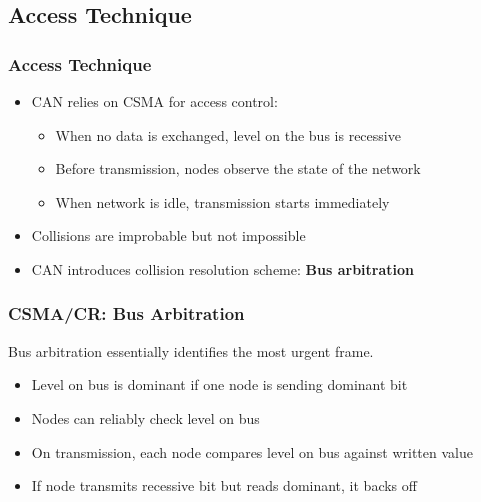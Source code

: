 \documentclass{beamer}
\begin{document}
\subsection{Access Technique}
\begin{frame}
	\frametitle{Access Technique}
	\begin{itemize}
		\item CAN relies on CSMA for access control:
		\begin{itemize}
			\item When no data is exchanged, level on the bus is recessive
			\item Before transmission, nodes observe the state of the network
			\item When network is idle, transmission starts immediately
		\end{itemize}
		\item Collisions are improbable but not impossible
		\item CAN introduces collision resolution scheme: \textbf{Bus arbitration}
	\end{itemize}	
\end{frame}

\begin{frame}
	\frametitle{CSMA/CR: Bus Arbitration}
	Bus arbitration essentially identifies the most urgent frame.
	\vfill
	\begin{itemize}
		\item Level on bus is dominant if one node is sending dominant bit
		\item Nodes can reliably check level on bus
		\item On transmission, each node compares level on bus against written value
		\item If node transmits recessive bit but reads dominant, it backs off
	\end{itemize}	
\end{frame}
\end{document}
